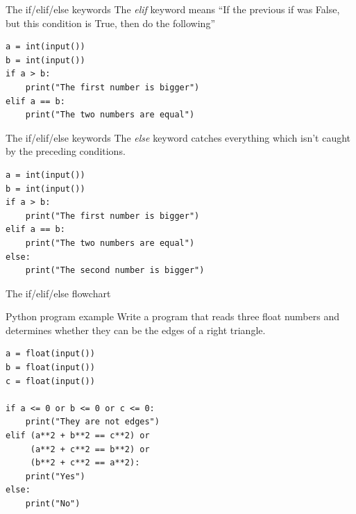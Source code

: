 \documentclass[aspectratio=169,]{beamer}
\begin{document}
\begin{frame}[fragile]{The if/elif/else keywords}
    The \emph{elif} keyword means ``If the previous if was False, but this condition is True, then do the following''
    \begin{verbatim}
a = int(input())
b = int(input())
if a > b:
    print("The first number is bigger")
elif a == b:
    print("The two numbers are equal")
    \end{verbatim}
\end{frame}

\begin{frame}[fragile]{The if/elif/else keywords}
    The \emph{else} keyword catches everything which isn't caught by the preceding conditions.
    \begin{verbatim}
a = int(input())
b = int(input())
if a > b:
    print("The first number is bigger")
elif a == b:
    print("The two numbers are equal")
else:
    print("The second number is bigger")
    \end{verbatim}
\end{frame}

\begin{frame}{The if/elif/else flowchart}
\end{frame}

\begin{frame}[fragile]{Python program example}
    Write a program that reads three float numbers and determines whether they can be the edges of a right triangle.
    \pause

    \begin{verbatim}
a = float(input())
b = float(input())
c = float(input())

if a <= 0 or b <= 0 or c <= 0:
    print("They are not edges")
elif (a**2 + b**2 == c**2) or
     (a**2 + c**2 == b**2) or
     (b**2 + c**2 == a**2):
    print("Yes")
else:
    print("No")
    \end{verbatim}
\end{frame}
\end{document}
